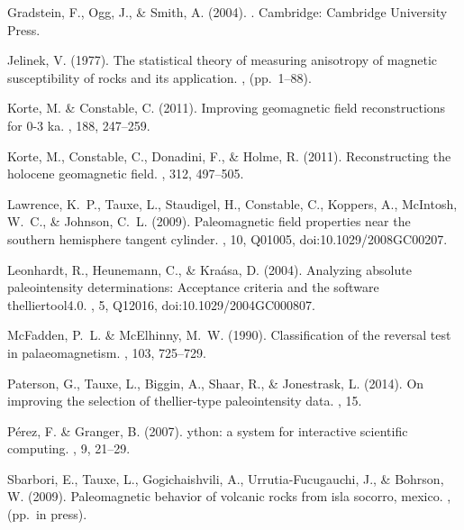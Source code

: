\documentclass[11pt]{book}
\begin{document}
{{{\begin{thebibliography}{}
Gradstein, F., Ogg, J., \& Smith, A. (2004).
.
\newblock Cambridge: Cambridge University Press.

Jelinek, V. (1977).
\newblock The statistical theory of measuring anisotropy of magnetic
  susceptibility of rocks and its application.
, (pp.\ 1--88).

Korte, M. \& Constable, C. (2011).
\newblock Improving geomagnetic field reconstructions for 0-3 ka.
, 188, 247--259.

Korte, M., Constable, C., Donadini, F., \& Holme, R. (2011).
\newblock Reconstructing the holocene geomagnetic field.
, 312, 497--505.

Lawrence, K.~P., Tauxe, L., Staudigel, H., Constable, C., Koppers, A.,
  McIntosh, W.~C., \& Johnson, C.~L. (2009).
\newblock Paleomagnetic field properties near the southern hemisphere tangent
  cylinder.
, 10, Q01005,
  doi:10.1029/2008GC00207.

Leonhardt, R., Heunemann, C., \& Kra\'asa, D. (2004).
\newblock Analyzing absolute paleointensity determinations: Acceptance criteria
  and the software thelliertool4.0.
, 5, Q12016, doi:10.1029/2004GC000807.

McFadden, P.~L. \& McElhinny, M.~W. (1990).
\newblock Classification of the reversal test in palaeomagnetism.
, 103, 725--729.

Paterson, G., Tauxe, L., Biggin, A., Shaar, R., \& Jonestrask, L. (2014).
\newblock On improving the selection of thellier-type paleointensity data.
, 15.

P\'{e}rez, F. \& Granger, B. (2007).
ython: a system for interactive scientific computing.
, 9, 21--29.

Sbarbori, E., Tauxe, L., Gogichaishvili, A., Urrutia-Fucugauchi, J., \&
  Bohrson, W. (2009).
\newblock Paleomagnetic behavior of volcanic rocks from isla socorro, mexico.
, (pp.\ in press).


\end{thebibliography}}}}
\end{document}
